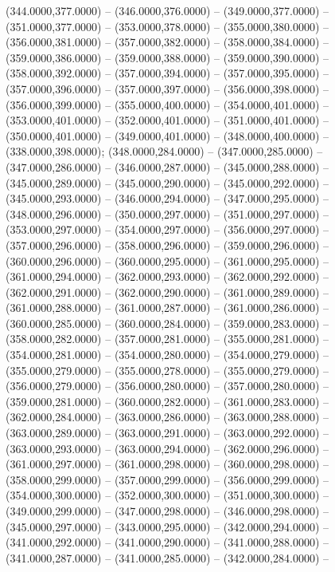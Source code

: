 \begin{scope}[draw=black,fill=cfdae61,line join=round,line width=0.208pt]
    (344.0000,377.0000) -- (346.0000,376.0000) -- (349.0000,377.0000) --
    (351.0000,377.0000) -- (353.0000,378.0000) -- (355.0000,380.0000) --
    (356.0000,381.0000) -- (357.0000,382.0000) -- (358.0000,384.0000) --
    (359.0000,386.0000) -- (359.0000,388.0000) -- (359.0000,390.0000) --
    (358.0000,392.0000) -- (357.0000,394.0000) -- (357.0000,395.0000) --
    (357.0000,396.0000) -- (357.0000,397.0000) -- (356.0000,398.0000) --
    (356.0000,399.0000) -- (355.0000,400.0000) -- (354.0000,401.0000) --
    (353.0000,401.0000) -- (352.0000,401.0000) -- (351.0000,401.0000) --
    (350.0000,401.0000) -- (349.0000,401.0000) -- (348.0000,400.0000) --
    (338.0000,398.0000);
   (348.0000,284.0000) -- (347.0000,285.0000) --
    (347.0000,286.0000) -- (346.0000,287.0000) -- (345.0000,288.0000) --
    (345.0000,289.0000) -- (345.0000,290.0000) -- (345.0000,292.0000) --
    (345.0000,293.0000) -- (346.0000,294.0000) -- (347.0000,295.0000) --
    (348.0000,296.0000) -- (350.0000,297.0000) -- (351.0000,297.0000) --
    (353.0000,297.0000) -- (354.0000,297.0000) -- (356.0000,297.0000) --
    (357.0000,296.0000) -- (358.0000,296.0000) -- (359.0000,296.0000) --
    (360.0000,296.0000) -- (360.0000,295.0000) -- (361.0000,295.0000) --
    (361.0000,294.0000) -- (362.0000,293.0000) -- (362.0000,292.0000) --
    (362.0000,291.0000) -- (362.0000,290.0000) -- (361.0000,289.0000) --
    (361.0000,288.0000) -- (361.0000,287.0000) -- (361.0000,286.0000) --
    (360.0000,285.0000) -- (360.0000,284.0000) -- (359.0000,283.0000) --
    (358.0000,282.0000) -- (357.0000,281.0000) -- (355.0000,281.0000) --
    (354.0000,281.0000) -- (354.0000,280.0000) -- (354.0000,279.0000) --
    (355.0000,279.0000) -- (355.0000,278.0000) -- (355.0000,279.0000) --
    (356.0000,279.0000) -- (356.0000,280.0000) -- (357.0000,280.0000) --
    (359.0000,281.0000) -- (360.0000,282.0000) -- (361.0000,283.0000) --
    (362.0000,284.0000) -- (363.0000,286.0000) -- (363.0000,288.0000) --
    (363.0000,289.0000) -- (363.0000,291.0000) -- (363.0000,292.0000) --
    (363.0000,293.0000) -- (363.0000,294.0000) -- (362.0000,296.0000) --
    (361.0000,297.0000) -- (361.0000,298.0000) -- (360.0000,298.0000) --
    (358.0000,299.0000) -- (357.0000,299.0000) -- (356.0000,299.0000) --
    (354.0000,300.0000) -- (352.0000,300.0000) -- (351.0000,300.0000) --
    (349.0000,299.0000) -- (347.0000,298.0000) -- (346.0000,298.0000) --
    (345.0000,297.0000) -- (343.0000,295.0000) -- (342.0000,294.0000) --
    (341.0000,292.0000) -- (341.0000,290.0000) -- (341.0000,288.0000) --
    (341.0000,287.0000) -- (341.0000,285.0000) -- (342.0000,284.0000) --

\end{scope}
